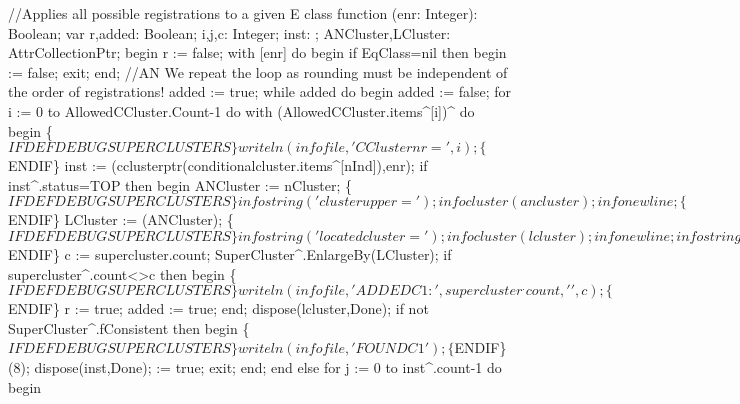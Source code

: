 //Applies all possible registrations to a given E class
function (enr: Integer): Boolean;
var
   r,added: Boolean;
   i,j,c: Integer;
   inst: ;
   ANCluster,LCluster: AttrCollectionPtr;
begin
   r := false;
   with [enr] do
   begin
      if EqClass=nil then
      begin
          := false;
         exit;
      end;
      //AN We repeat the loop as rounding must be independent of the order of registrations!
      added := true;
      while added do
      begin
         added := false;
         for i := 0 to AllowedCCluster.Count-1 do
            with (AllowedCCluster.items^[i])^ do
         begin
            \{$IFDEF DEBUGSUPERCLUSTERS\}
            writeln(infofile,'CClusternr=',i);
            \{$ENDIF\}
            inst := (cclusterptr(conditionalcluster.items^[nInd]),enr);
            if inst^.status=TOP then
            begin
               ANCluster := nCluster;
               \{$IFDEF DEBUGSUPERCLUSTERS\}
               infostring('clusterupper=');infocluster(ancluster);infonewline;
               \{$ENDIF\}
               LCluster := (ANCluster);
               \{$IFDEF DEBUGSUPERCLUSTERS\}
               infostring('locatedcluster=');infocluster(lcluster);infonewline;
               infostring('supercluster=');infocluster(supercluster);infonewline;
               \{$ENDIF\}
               c := supercluster.count;
               SuperCluster^.EnlargeBy(LCluster);
               if supercluster^.count<>c then
               begin
                  \{$IFDEF DEBUGSUPERCLUSTERS\}
                  writeln(infofile,'ADDEDC1:',supercluster^.count,' ',c);
                  \{$ENDIF\}
                  r := true;
                  added := true;
               end;
               dispose(lcluster,Done);
               if not SuperCluster^.fConsistent then
               begin
                  \{$IFDEF DEBUGSUPERCLUSTERS\}
                  writeln(infofile,'FOUNDC1');
                  \{$ENDIF\}
                  (8);
                  dispose(inst,Done);
                   := true;
                  exit;
               end;
            end
            else
               for j := 0 to inst^.count-1 do
               begin
